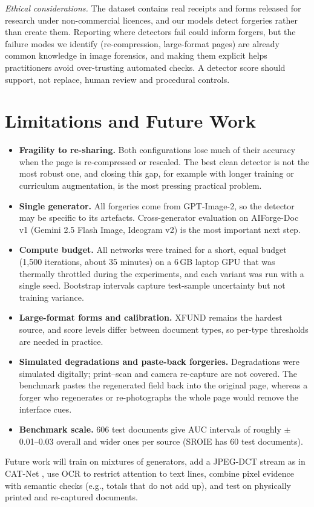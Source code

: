 \documentclass[conference]{IEEEtran}
\begin{document}
\emph{Ethical considerations.} The dataset contains real receipts and forms released for research under non-commercial licences, and our models detect forgeries rather than create them. Reporting where detectors fail could inform forgers, but the failure modes we identify (re-compression, large-format pages) are already common knowledge in image forensics, and making them explicit helps practitioners avoid over-trusting automated checks. A detector score should support, not replace, human review and procedural controls.

\section{Limitations and Future Work}\label{sec:lim}
\begin{itemize}
\item \textbf{Fragility to re-sharing.} Both configurations lose much of their accuracy when the page is re-compressed or rescaled. The best clean detector is not the most robust one, and closing this gap, for example with longer training or curriculum augmentation, is the most pressing practical problem.
\item \textbf{Single generator.} All forgeries come from GPT-Image-2, so the detector may be specific to its artefacts. Cross-generator evaluation on AIForge-Doc v1 (Gemini 2.5 Flash Image, Ideogram v2) is the most important next step.
\item \textbf{Compute budget.} All networks were trained for a short, equal budget (1,500 iterations, about 35 minutes) on a 6\,GB laptop GPU that was thermally throttled during the experiments, and each variant was run with a single seed. Bootstrap intervals capture test-sample uncertainty but not training variance.
\item \textbf{Large-format forms and calibration.} XFUND remains the hardest source, and score levels differ between document types, so per-type thresholds are needed in practice.
\item \textbf{Simulated degradations and paste-back forgeries.} Degradations were simulated digitally; print--scan and camera re-capture are not covered. The benchmark pastes the regenerated field back into the original page, whereas a forger who regenerates or re-photographs the whole page would remove the interface cues.
\item \textbf{Benchmark scale.} 606 test documents give AUC intervals of roughly $\pm$0.01--0.03 overall and wider ones per source (SROIE has 60 test documents).
\end{itemize}
Future work will train on mixtures of generators, add a JPEG-DCT stream as in CAT-Net \cite{catnet}, use OCR to restrict attention to text lines, combine pixel evidence with semantic checks (e.g., totals that do not add up), and test on physically printed and re-captured documents.
\end{document}
